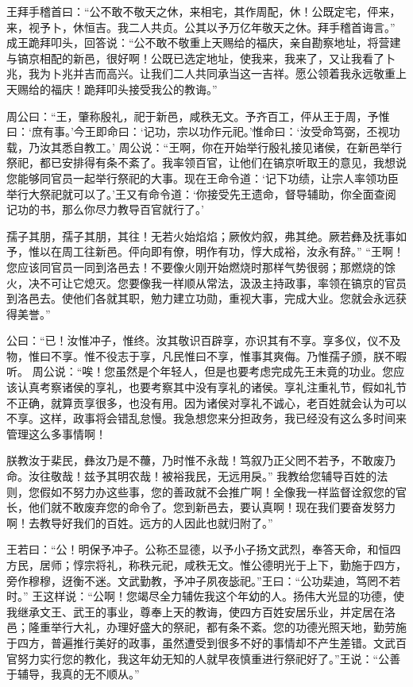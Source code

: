 \documentclass[a4paper,12pt,UTF8,twoside]{ctexbook}
\begin{document}
王拜手稽首曰：“公不敢不敬天之休，来相宅，其作周配，休！公既定宅，伻来，来，视予卜，休恒吉。我二人共贞。公其以予万亿年敬天之休。拜手稽首诲言。”
成王跪拜叩头，回答说：“公不敢不敬重上天赐给的福庆，亲自勘察地址，将营建与镐京相配的新邑，很好啊！公既已选定地址，使我来，我来了，又让我看了卜兆，我为卜兆并吉而高兴。让我们二人共同承当这一吉祥。愿公领着我永远敬重上天赐给的福庆！跪拜叩头接受我公的教诲。”

周公曰：“王，肇称殷礼，祀于新邑，咸秩无文。予齐百工，伻从王于周，予惟曰：‘庶有事。’今王即命曰：‘记功，宗以功作元祀。’惟命曰：‘汝受命笃弼，丕视功载，乃汝其悉自教工。’
周公说：“王啊，你在开始举行殷礼接见诸侯，在新邑举行祭祀，都已安排得有条不紊了。我率领百官，让他们在镐京听取王的意见，我想说您能够同官员一起举行祭祀的大事。现在王命令道：‘记下功绩，让宗人率领功臣举行大祭祀就可以了。’王又有命令道：‘你接受先王遗命，督导辅助，你全面查阅记功的书，那么你尽力教导百官就行了。’

孺子其朋，孺子其朋，其往！无若火始焰焰；厥攸灼叙，弗其绝。厥若彝及抚事如予，惟以在周工往新邑。伻向即有僚，明作有功，惇大成裕，汝永有辞。”
“王啊！您应该同官员一同到洛邑去！不要像火刚开始燃烧时那样气势很弱；那燃烧的馀火，决不可让它熄灭。您要像我一样顺从常法，汲汲主持政事，率领在镐京的官员到洛邑去。使他们各就其职，勉力建立功勋，重视大事，完成大业。您就会永远获得美誉。”

公曰：“已！汝惟冲子，惟终。汝其敬识百辟享，亦识其有不享。享多仪，仪不及物，惟曰不享。惟不役志于享，凡民惟曰不享，惟事其爽侮。乃惟孺子颁，朕不暇听。
周公说：“唉！您虽然是个年轻人，但是也要考虑完成先王未竟的功业。您应该认真考察诸侯的享礼，也要考察其中没有享礼的诸侯。享礼注重礼节，假如礼节不正确，就算贡享很多，也没有用。因为诸侯对享礼不诚心，老百姓就会认为可以不享。这样，政事将会错乱怠慢。我急想您来分担政务，我已经没有这么多时间来管理这么多事情啊！

朕教汝于棐民，彝汝乃是不蘉，乃时惟不永哉！笃叙乃正父罔不若予，不敢废乃命。汝往敬哉！兹予其明农哉！被裕我民，无远用戾。”
我教给您辅导百姓的法则，您假如不努力办这些事，您的善政就不会推广啊！全像我一样监督诠叙您的官长，他们就不敢废弃您的命令了。您到新邑去，要认真啊！现在我们要奋发努力啊！去教导好我们的百姓。远方的人因此也就归附了。”

王若曰：“公！明保予冲子。公称丕显德，以予小子扬文武烈，奉答天命，和恒四方民，居师；惇宗将礼，称秩元祀，咸秩无文。惟公德明光于上下，勤施于四方，旁作穆穆，迓衡不迷。文武勤教，予冲子夙夜毖祀。”王曰：“公功棐迪，笃罔不若时。”
王这样说：“公啊！您竭尽全力辅佐我这个年幼的人。扬伟大光显的功德，使我继承文王、武王的事业，尊奉上天的教诲，使四方百姓安居乐业，并定居在洛邑；隆重举行大礼，办理好盛大的祭祀，都有条不紊。您的功德光照天地，勤劳施于四方，普遍推行美好的政事，虽然遭受到很多不好的事情却不产生差错。文武百官努力实行您的教化，我这年幼无知的人就早夜慎重进行祭祀好了。”王说：“公善于辅导，我真的无不顺从。”
\end{document}
